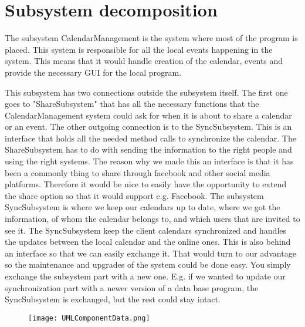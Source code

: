 \section{Subsystem decomposition}
The subsystem CalendarManagement is the system where most of the program is placed. This system is responsible for all the local events happening in the system. This means that it would handle creation of the calendar, events and provide the necessary GUI for the local program. 

This subsystem has two connections outside the subsystem itself. The first one goes to "ShareSubsystem" that has all the necessary functions that the CalendarManagement system could ask for when it is about to share a calendar or an event. The other outgoing connection is to the SyncSubsystem. This is an interface that holds all the needed method calls to synchronize the calendar.
\newline
\newline
The ShareSubsystem has to do with sending the information to the right people and using the right systems. The reason why we made this an interface is that it has been a commonly thing to share through facebook and other social media platforms. Therefore it would be nice to easily have the opportunity to extend the share option so that it would support e.g. Facebook. 
\newline
\newline
The subsystem SyncSubsystem is where we keep our calendars up to date, where we got the information, of whom the calendar belongs to, and which users that are invited to see it. The SyncSubsystem keep the client calendars synchronized and handles the updates between the local calendar and the online ones. This is also behind an interface so that we can easily exchange it. That would turn to our advantage so the maintenance and upgrades of the system could be done easy. You simply exchange the subsystem part with a new one. E.g. if we wanted to update our synchronization part with a newer version of a data base program, the SyncSubsystem is exchanged, but the rest could stay intact. 
\newline
\begin{figure}[h]
\centering
\texttt{[image: UMLComponentData.png]}
\label{figur:UMLComponentData}
\end{figure}